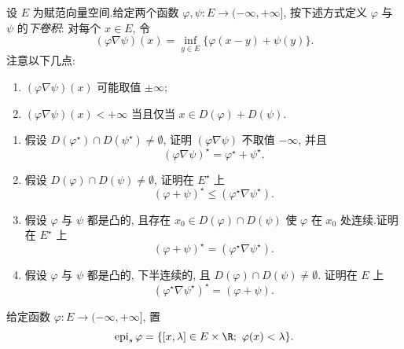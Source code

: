 \begin{exercise}[下卷积.]
\label{exer:1.23}
设 $E$ 为赋范向量空间.给定两个函数 $\varphi,\psi:E\to(-\infty,+\infty]$, 按下述方式定义
$\varphi$ 与 $\psi$ 的\emph{下卷积}: 对每个 $x\in E$, 令
\begin{equation*}
(\varphi\nabla\psi)(x)=\inf_{y\in E}\{\varphi(x-y)+\psi(y)\}.
\end{equation*}
注意以下几点:
\begin{enumerate}[label=(\roman*), leftmargin=2.4em, itemsep=0.15em]
	\item $(\varphi\nabla\psi)(x)$ 可能取值 $\pm\infty$;
	\item $(\varphi\nabla\psi)(x)<+\infty$ 当且仅当 $x\in D(\varphi)+D(\psi)$.
\end{enumerate}

\begin{enumerate}[label=\arabic*., leftmargin=2.2em, itemsep=0.25em]
	\item 假设 $D(\varphi^\star)\cap D(\psi^\star)\ne\emptyset$, 证明 $(\varphi\nabla\psi)$ 不取值
	      $-\infty$, 并且
	      \begin{equation*}
	      (\varphi\nabla\psi)^\star=\varphi^\star+\psi^\star.
	      \end{equation*}
	\item 假设 $D(\varphi)\cap D(\psi)\ne\emptyset$, 证明在 $E^\star$ 上
	      \begin{equation*}
	      (\varphi+\psi)^\star\le(\varphi^\star\nabla\psi^\star).
	      \end{equation*}
	\item 假设 $\varphi$ 与 $\psi$ 都是凸的, 且存在 $x_0\in D(\varphi)\cap D(\psi)$ 使 $\varphi$
	      在 $x_0$ 处连续.证明在 $E^\star$ 上
	      \begin{equation*}
	      (\varphi+\psi)^\star=(\varphi^\star\nabla\psi^\star).
	      \end{equation*}
	\item 假设 $\varphi$ 与 $\psi$ 都是凸的, 下半连续的, 且 $D(\varphi)\cap D(\psi)\ne\emptyset$.
	      证明在 $E$ 上
	      \begin{equation*}
	      (\varphi^\star\nabla\psi^\star)^\star=(\varphi+\psi).
	      \end{equation*}
\end{enumerate}
给定函数 $\varphi:E\to(-\infty,+\infty]$, 置
\begin{equation*}
\operatorname{epi}_{s}\varphi=\{[x,\lambda]\in E\times\R;\ \varphi(x)<\lambda\}.
\end{equation*}


\end{exercise}
